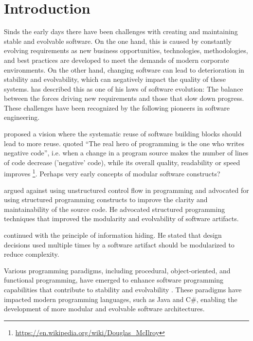 \chapter{Introduction} \label{chap_introduction}

Sinds the early days there have been challenges with creating and maintaining stable and
evolvable software. On the one hand, this is caused by constantly evolving requirements as
new business opportunities, technologies, methodologies, and best practices are developed
to meet the demands of modern corporate environments. On the other hand, changing software
can lead to deterioration in stability and evolvability, which can negatively impact the
quality of these systems. \textcite{lehman_programs_1980} has described this as one of his
laws of software evolution: The balance between the forces driving new requirements and
those that slow down progress. These challenges have been recognized by the following
pioneers in software engineering. 

\textcite{d_mcilroy_nato_1968} proposed a vision where the systematic reuse of software
building blocks should lead to more reuse. \textcite{d_mcilroy_nato_1968} quoted
\enquote{The real hero of programming is the one who writes negative code}, i.e. when a
change in a program source makes the number of lines of code decrease ('negative' code),
while its overall quality, readability or speed improves
\footnote{\url{https://en.wikipedia.org/wiki/Douglas_McIlroy}}. Perhaps very early concepts
of modular software constructs?

\textcite{dijkstra_letters_1968} argued against using unstructured control flow in
programming and advocated for using structured programming constructs to improve the
clarity and maintainability of the source code. He advocated structured programming
techniques that improved the modularity and evolvability of software artifacts.

\textcite{parnas_criteria_1972} continued with the principle of information hiding. He
stated that design decisions used multiple times by a software artifact should be
modularized to reduce complexity. 

Various programming paradigms, including procedural, object-oriented, and functional
programming, have emerged to enhance software programming capabilities that contribute to
stability and evolvability \parencite{mannaert_normalized_2016}. These paradigms have
impacted modern programming languages, such as Java and C\#, enabling the development of
more modular and evolvable software architectures.

